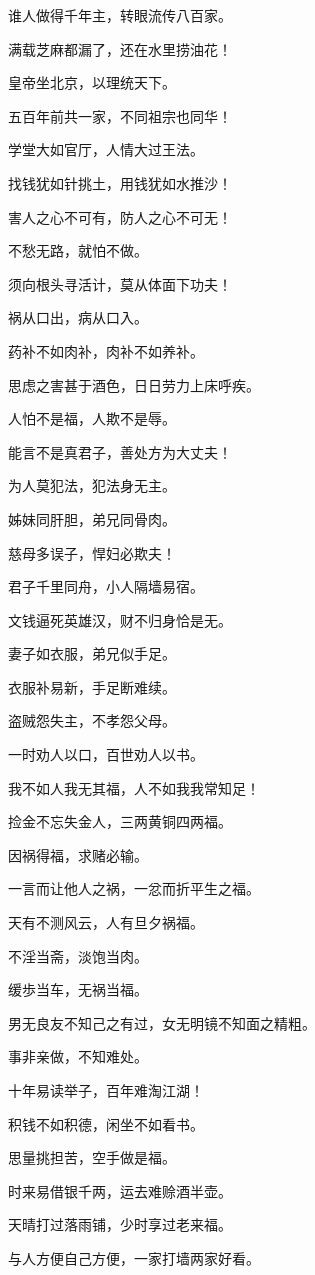 \documentclass[12pt,oneside]{book}
\begin{document}
谁人做得千年主，转眼流传八百家。

满载芝麻都漏了，还在水里捞油花！

皇帝坐北京，以理统天下。

五百年前共一家，不同祖宗也同华！

学堂大如官厅，人情大过王法。

找钱犹如针挑土，用钱犹如水推沙！

害人之心不可有，防人之心不可无！

不愁无路，就怕不做。

须向根头寻活计，莫从体面下功夫！

祸从口出，病从口入。

药补不如肉补，肉补不如养补。

思虑之害甚于酒色，日日劳力上床呼疾。

人怕不是福，人欺不是辱。

能言不是真君子，善处方为大丈夫！

为人莫犯法，犯法身无主。

姊妹同肝胆，弟兄同骨肉。

慈母多误子，悍妇必欺夫！

君子千里同舟，小人隔墙易宿。

文钱逼死英雄汉，财不归身恰是无。

妻子如衣服，弟兄似手足。

衣服补易新，手足断难续。

盗贼怨失主，不孝怨父母。

一时劝人以口，百世劝人以书。

我不如人我无其福，人不如我我常知足！

捡金不忘失金人，三两黄铜四两福。

因祸得福，求赌必输。

一言而让他人之祸，一忿而折平生之福。

天有不测风云，人有旦夕祸福。

不淫当斋，淡饱当肉。

缓歩当车，无祸当福。

男无良友不知己之有过，女无明镜不知面之精粗。

事非亲做，不知难处。

十年易读举子，百年难淘江湖！

积钱不如积德，闲坐不如看书。

思量挑担苦，空手做是福。

时来易借银千两，运去难赊酒半壶。

天晴打过落雨铺，少时享过老来福。

与人方便自己方便，一家打墙两家好看。
\end{document}
